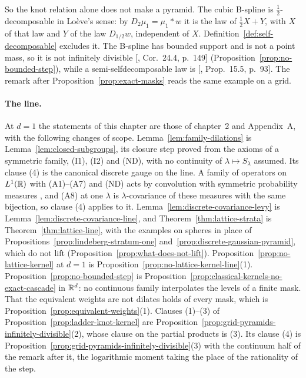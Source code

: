So the knot relation alone does not make a pyramid. The cubic B-spline is $\tfrac12$-decomposable in
Lo\`eve's sense: by $D_2\mu_1 = \mu_1 * w$ it is the law of $\tfrac12X + Y$, with $X$ of that law and
$Y$ of the law $D_{1/2}w$, independent of $X$. Definition~\ref{def:self-decomposable} excludes it. The B-spline has bounded
support and is not a point mass, so it is not infinitely divisible
[, Cor.~24.4, p.~149] (Proposition~\ref{prop:no-bounded-step}), while a
semi-selfdecomposable law is [, Prop.~15.5, p.~93]. The remark after
Proposition~\ref{prop:exact-masks} reads the same example on a grid.

\paragraph{The line.} At $d = 1$ the statements of this chapter are those of chapter~2 and
Appendix~A, with the following changes of scope. Lemma~\ref{lem:family-dilations} is
Lemma~\ref{lem:closed-subgroups}, its closure step proved from the axioms of a symmetric family, (I1),
(I2) and (ND), with no continuity of $\lambda \mapsto S_\lambda$ assumed. Its clause (4) is the
canonical discrete gauge on the line. A family of operators on $L^1(\mathbb{R})$ with (A1)--(A7) and (ND)
acts by convolution with symmetric probability measures , and (A8)
at one $\lambda$ is $\lambda$-covariance of these measures with the same bijection, so clause (4)
applies to it. Lemma~\ref{lem:discrete-covariance-levy} is
Lemma~\ref{lem:discrete-covariance-line}, and Theorem~\ref{thm:lattice-strata} is
Theorem~\ref{thm:lattice-line}, with the examples on spheres in place of
Propositions~\ref{prop:lindeberg-stratum-one} and~\ref{prop:discrete-gaussian-pyramid}, which do not
lift (Proposition~\ref{prop:what-does-not-lift}). Proposition~\ref{prop:no-lattice-kernel} at
$d = 1$ is Proposition~\ref{prop:no-lattice-kernel-line}(1). Proposition~\ref{prop:no-bounded-step} is
Proposition~\ref{prop:classical-kernels-no-exact-cascade} in $\mathbb{R}^d$: no continuous family
interpolates the levels of a finite mask. That the equivalent weights are not dilates holds of every
mask, which is Proposition~\ref{prop:equivalent-weights}(1). Clauses (1)--(3) of
Proposition~\ref{prop:ladder-knot-kernel} are Proposition~\ref{prop:grid-pyramids-infinitely-divisible}(2),
whose clause on the partial products is (3). Its clause (4) is
Proposition~\ref{prop:grid-pyramids-infinitely-divisible}(3) with the continuum half of the remark
after it, the logarithmic moment taking the place of the rationality of the step.
